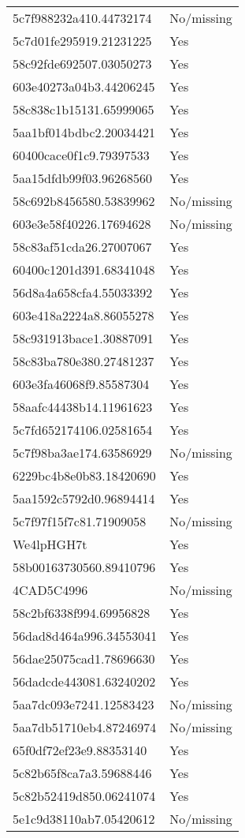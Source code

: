 \begin{tabular}{ll}
5c7f988232a410.44732174 & No/missing \\
5c7d01fe295919.21231225 & Yes \\
58c92fde692507.03050273 & Yes \\
603e40273a04b3.44206245 & Yes \\
58c838c1b15131.65999065 & Yes \\
5aa1bf014bdbc2.20034421 & Yes \\
60400cace0f1c9.79397533 & Yes \\
5aa15dfdb99f03.96268560 & Yes \\
58c692b8456580.53839962 & No/missing \\
603e3e58f40226.17694628 & No/missing \\
58c83af51cda26.27007067 & Yes \\
60400c1201d391.68341048 & Yes \\
56d8a4a658cfa4.55033392 & Yes \\
603e418a2224a8.86055278 & Yes \\
58c931913bace1.30887091 & Yes \\
58c83ba780e380.27481237 & Yes \\
603e3fa46068f9.85587304 & Yes \\
58aafc44438b14.11961623 & Yes \\
5c7fd652174106.02581654 & Yes \\
5c7f98ba3ae174.63586929 & No/missing \\
6229bc4b8e0b83.18420690 & Yes \\
5aa1592c5792d0.96894414 & Yes \\
5c7f97f15f7c81.71909058 & No/missing \\
We4lpHGH7t & Yes \\
58b00163730560.89410796 & Yes \\
4CAD5C4996 & No/missing \\
58c2bf6338f994.69956828 & Yes \\
56dad8d464a996.34553041 & Yes \\
56dae25075cad1.78696630 & Yes \\
56dadcde443081.63240202 & Yes \\
5aa7dc093e7241.12583423 & No/missing \\
5aa7db51710eb4.87246974 & No/missing \\
65f0df72ef23e9.88353140 & Yes \\
5c82b65f8ca7a3.59688446 & Yes \\
5c82b52419d850.06241074 & Yes \\
5e1c9d38110ab7.05420612 & No/missing \\

\end{tabular}
